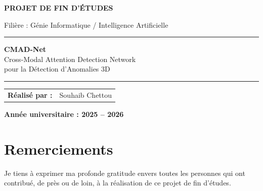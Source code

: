 \documentclass[12pt,a4paper,oneside]{report}
\begin{document}
\begin{titlepage}
\begin{center}

\vspace*{1.5cm}

{\large \textbf{PROJET DE FIN D'ÉTUDES}}

\vspace{0.5cm}
{\large Filière : Génie Informatique / Intelligence Artificielle}

\vspace{2.5cm}

\rule{\textwidth}{1.5pt}
\vspace{0.6cm}
{\Huge \textbf{\color{chaptercolor}CMAD-Net}}\\[0.5cm]
{\LARGE Cross-Modal Attention Detection Network}\\[0.4cm]
{\Large pour la Détection d'Anomalies 3D}
\vspace{0.6cm}
\rule{\textwidth}{1.5pt}

\vspace{2.5cm}

{\large
\begin{tabular}{rl}
\textbf{Réalisé par :} & Souhaib Chettou \\[10pt]
\end{tabular}
}

\vspace{3cm}

{\large \textbf{Année universitaire : 2025 -- 2026}}

\vfill

\end{center}
\end{titlepage}


\chapter*{Remerciements}

Je tiens à exprimer ma profonde gratitude envers toutes les personnes qui ont contribué, de près ou de loin, à la réalisation de ce projet de fin d'études.
\end{document}
